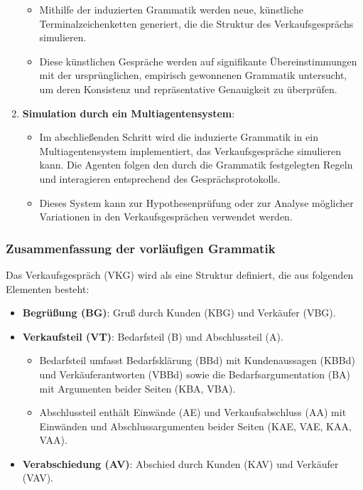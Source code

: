 \documentclass[
]{article}
\begin{document}
\begin{enumerate}
  \begin{itemize}
  \item
    Mithilfe der induzierten Grammatik werden neue, künstliche
    Terminalzeichenketten generiert, die die Struktur des
    Verkaufsgesprächs simulieren.
  \item
    Diese künstlichen Gespräche werden auf signifikante
    Übereinstimmungen mit der ursprünglichen, empirisch gewonnenen
    Grammatik untersucht, um deren Konsistenz und repräsentative
    Genauigkeit zu überprüfen.
  \end{itemize}
\item
  \textbf{Simulation durch ein Multiagentensystem}:

  \begin{itemize}
  \item
    Im abschließenden Schritt wird die induzierte Grammatik in ein
    Multiagentensystem implementiert, das Verkaufsgespräche simulieren
    kann. Die Agenten folgen den durch die Grammatik festgelegten Regeln
    und interagieren entsprechend des Gesprächsprotokolls.
  \item
    Dieses System kann zur Hypothesenprüfung oder zur Analyse möglicher
    Variationen in den Verkaufsgesprächen verwendet werden.
  \end{itemize}
\end{enumerate}

\subsubsection{\texorpdfstring{\textbf{Zusammenfassung der vorläufigen
Grammatik}}{Zusammenfassung der vorläufigen Grammatik}}\label{zusammenfassung-der-vorluxe4ufigen-grammatik}

Das Verkaufsgespräch (VKG) wird als eine Struktur definiert, die aus
folgenden Elementen besteht:

\begin{itemize}
\item
  \textbf{Begrüßung (BG)}: Gruß durch Kunden (KBG) und Verkäufer (VBG).
\item
  \textbf{Verkaufsteil (VT)}: Bedarfsteil (B) und Abschlussteil (A).

  \begin{itemize}
  \item
    Bedarfsteil umfasst Bedarfsklärung (BBd) mit Kundenaussagen (KBBd)
    und Verkäuferantworten (VBBd) sowie die Bedarfsargumentation (BA)
    mit Argumenten beider Seiten (KBA, VBA).
  \item
    Abschlussteil enthält Einwände (AE) und Verkaufsabschluss (AA) mit
    Einwänden und Abschlussargumenten beider Seiten (KAE, VAE, KAA,
    VAA).
  \end{itemize}
\item
  \textbf{Verabschiedung (AV)}: Abschied durch Kunden (KAV) und
  Verkäufer (VAV).
\end{itemize}
\end{document}
